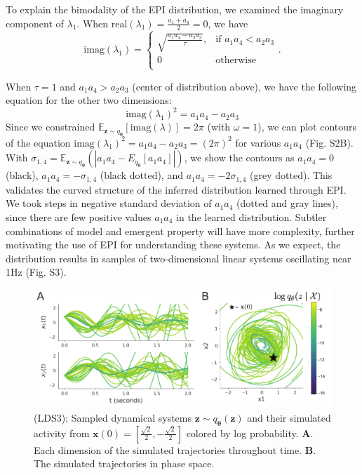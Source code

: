 \documentclass[11pt]{article}
\begin{document}
To explain the bimodality of the EPI distribution, we examined the imaginary component of $\lambda_1$.  When $\text{real}(\lambda_1) = \frac{a_1 + a_4}{2} = 0$, we have
\begin{equation}
\text{imag}(\lambda_1) = \begin{cases}
                             \sqrt{\frac{a_1 a_4 - a_2 a_3}{\tau}},  & \text{if } a_1 a_4 < a_2 a_3 \\
                             0 & \text{otherwise } \\
                         \end{cases}.
\end{equation}

When $\tau=1$ and $a_1 a_4 > a_2 a_3$ (center of distribution above), we have the following equation for the other two dimensions:
\begin{equation}
\text{imag}(\lambda_1)^2 = a_1 a_4 - a_2 a_3
\end{equation}
Since we constrained $\mathbb{E}_{\mathbf{z} \sim q_{\bm{\theta}}}\left[\text{imag}(\lambda)\right] = 2 \pi$ (with $\omega=1$), we can plot contours of the equation $\text{imag}(\lambda_1)^2 = a_1 a_4 - a_2 a_3 = (2 \pi)^2$ for various $a_1 a_4$ (Fig. S2B). 
With $\sigma_{1,4} = \mathbb{E}_{\mathbf{z} \sim q_{\bm{\theta}}}(|a_1 a_4 - E_{q_{\bm{\theta}}}[a_1 a_4]|)$, we show the contours as $a_1 a_4 = 0$ (black), $a_1 a_4 = -\sigma_{1,4}$ (black dotted), and $a_1 a_4 = -2\sigma_{1,4}$ (grey dotted). 
This validates the curved structure of the inferred distribution learned through EPI.  
We took steps in negative standard deviation of $a_1 a_4$ (dotted and gray lines), since there are few positive values $a_1 a_4$ in the learned distribution.  
Subtler combinations of model and emergent property will have more complexity, further motivating the use of EPI for understanding these systems.  
As we expect, the distribution results in samples of two-dimensional linear systems oscillating near 1Hz (Fig. S3).

\begin{figure}
\begin{center}
\includegraphics[scale=0.8]{figures/figLDS3/figLDS3.pdf}
\end{center}
\begin{flushleft}
\caption{\small (LDS3): Sampled dynamical systems $\mathbf{z} \sim q_{\bm{\theta}}(\mathbf{z})$ and their simulated activity from $\mathbf{x}(0) = [\frac{\sqrt{2}}{2}, -\frac{\sqrt{2}}{2}]$ colored by log probability. 
\textbf{A}. Each dimension of the simulated trajectories throughout time.  
\textbf{B}.  The simulated trajectories in phase space.}
\end{flushleft}
\label{fig:LDS3}
\end{figure}
\end{document}
